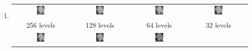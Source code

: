 \documentclass[a4paper]{article}
\begin{document}
\begin{enumerate}
\item
\begin{center}
\begin{tabular}{cccc}
    \includegraphics[width=0.2\textwidth]{../11_skull.png} &
    \includegraphics[width=0.2\textwidth]{../11_skull_k7.png} &
    \includegraphics[width=0.2\textwidth]{../11_skull_k6.png} &
    \includegraphics[width=0.2\textwidth]{../11_skull_k5.png}\\
    256 levels & 128 levels & 64 levels & 32 levels \\
    \includegraphics[width=0.2\textwidth]{../11_skull_k4.png} &
    \includegraphics[width=0.2\textwidth]{../11_skull_k3.png} &
    \includegraphics[width=0.2\textwidth]{../11_skull_k2.png} &

\end{tabular}
\end{center}
\end{enumerate}
\end{document}
